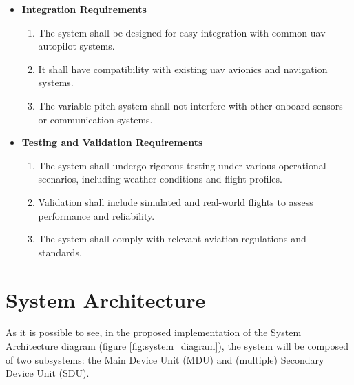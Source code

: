 \begin{itemize}
    \item \textbf{Integration Requirements}
          \begin{enumerate}[start=10,label={\bfseries (REQ\_\arabic*):},wide = 0pt, leftmargin = 3em]
              \item The system shall be designed for easy integration with common \gls{uav} autopilot systems.
              \item It shall have compatibility with existing \gls{uav} avionics and navigation systems.
              \item The variable-pitch system shall not interfere with other onboard sensors or communication systems.
          \end{enumerate}

    \item \textbf{Testing and Validation Requirements}
          \begin{enumerate}[start=13,label={\bfseries (REQ\_\arabic*):},wide = 0pt, leftmargin = 3em]
              \item The system shall undergo rigorous testing under various operational scenarios, including weather conditions and flight profiles.
              \item Validation shall include simulated and real-world flights to assess performance and reliability.
              \item The system shall comply with relevant aviation regulations and standards.
          \end{enumerate}
\end{itemize}

\section{System Architecture}
As it is possible to see, in the proposed implementation of the System Architecture diagram (figure \ref{fig:system_diagram}), the system will be composed of two subsystems: the Main Device Unit (MDU) and (multiple) Secondary Device Unit (SDU).

